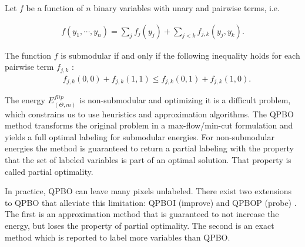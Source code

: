 Let $f$ be a function of $n$ binary variables with unary and pairwise terms, i.e.

\begin{align*}
f(y_1,\cdots, y_n) = \sum_{j}{f_j(y_j)} + \sum_{j < k}{f_{j,k}(y_j,y_k)}.
\end{align*}

The function $f$ is submodular if and only if the following inequality holds for each pairwise term $f_{j,k}$ \cite{kolmogorov04whatenergies}:
\begin{align*}
  \quad f_{j,k}(0,0) + f_{j,k}(1,1) \leq f_{j,k}(0,1) + f_{j,k}(1,0).
\end{align*}

The energy $E_{(\Theta,m)}^{flip}$ is non-submodular and optimizing it is a difficult problem, which constrains us to use heuristics and
approximation algorithms. The QPBO method \cite{hammer84} transforms the original problem in a max-flow/min-cut
formulation and yields a full optimal labeling for submodular energies. For non-submodular energies the method is
guaranteed to return a partial labeling with the property that the set of labeled variables is part of an optimal
solution. That property is called partial optimality.

In practice, QPBO can leave many pixels unlabeled. There exist two extensions to QPBO that alleviate this limitation:
QPBOI (improve) and QPBOP (probe) \cite{rother07qpbo}. The first is an approximation method that is guaranteed to not increase the energy,
but loses the property of partial optimality. The second is an exact method which is reported to label more variables
than QPBO.

